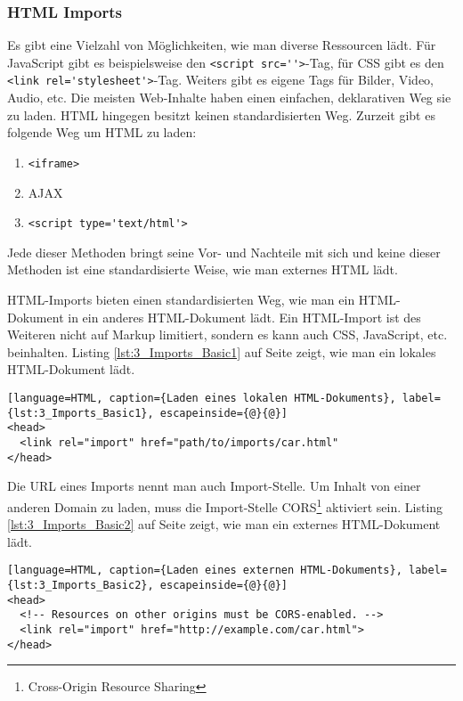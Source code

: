\subsubsection{HTML Imports}
\label{sec:3_WC_Imports}

Es gibt eine Vielzahl von Möglichkeiten, wie man diverse Ressourcen lädt. Für JavaScript gibt es beispielsweise den \lstinline|<script src=''>|-Tag, für CSS gibt es den \lstinline|<link rel='stylesheet'>|-Tag. Weiters gibt es eigene Tags für Bilder, Video, Audio, etc. Die meisten Web-Inhalte haben einen einfachen, deklarativen Weg sie zu laden. HTML hingegen besitzt keinen standardisierten Weg. Zurzeit gibt es folgende Weg um HTML zu laden:
\begin{enumerate}
\item \lstinline|<iframe>|
\item AJAX
\item \lstinline|<script type='text/html'>|
\end{enumerate}

Jede dieser Methoden bringt seine Vor- und Nachteile mit sich und keine dieser Methoden ist eine standardisierte Weise, wie man externes HTML lädt.

HTML-Imports bieten einen standardisierten Weg, wie man ein HTML-Dokument in ein anderes HTML-Dokument lädt. Ein HTML-Import ist des Weiteren nicht auf Markup limitiert, sondern es kann auch CSS, JavaScript, etc. beinhalten. Listing \ref{lst:3_Imports_Basic1} auf Seite \pageref{lst:3_Imports_Basic1} zeigt, wie man ein lokales HTML-Dokument lädt.

\begin{lstlisting}[language=HTML, caption={Laden eines lokalen HTML-Dokuments}, label={lst:3_Imports_Basic1}, escapeinside={@}{@}]
<head>
  <link rel="import" href="path/to/imports/car.html"
</head>
\end{lstlisting}

Die URL eines Imports nennt man auch \glqq Import-Stelle\grqq . Um Inhalt von einer anderen Domain zu laden, muss die Import-Stelle CORS\footnote{Cross-Origin Resource Sharing} aktiviert sein. Listing \ref{lst:3_Imports_Basic2} auf Seite \pageref{lst:3_Imports_Basic2} zeigt, wie man ein externes HTML-Dokument lädt.

\begin{lstlisting}[language=HTML, caption={Laden eines externen HTML-Dokuments}, label={lst:3_Imports_Basic2}, escapeinside={@}{@}]
<head>
  <!-- Resources on other origins must be CORS-enabled. -->
  <link rel="import" href="http://example.com/car.html">
</head>
\end{lstlisting}

